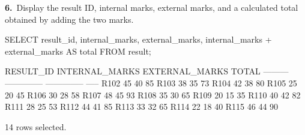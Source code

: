 \noindent\begin{minipage}{\linewidth}
\begingroup{}
{\fontsize{14}{17}\selectfont\textbf{6.}}\ Display the result ID, internal marks, external marks, and a calculated total obtained by adding the two marks.\par
\endgroup\vspace{12pt}


\begin{sqlcode}
SELECT result_id, internal_marks, external_marks,
       internal_marks + external_marks AS total
FROM result;
\end{sqlcode}

\vspace{18pt}


\begin{sqlout}[fontsize=\small]
RESULT_ID  INTERNAL_MARKS  EXTERNAL_MARKS  TOTAL
---------  --------------  --------------  -----
R102                   45              40     85
R103                   38              35     73
R104                   42              38     80
R105                   25              20     45
R106                   30              28     58
R107                   48              45     93
R108                   35              30     65
R109                   20              15     35
R110                   40              42     82
R111                   28              25     53
R112                   44              41     85
R113                   33              32     65
R114                   22              18     40
R115                   46              44     90

14 rows selected.
\end{sqlout}
\end{minipage}\par\vspace{24pt}

